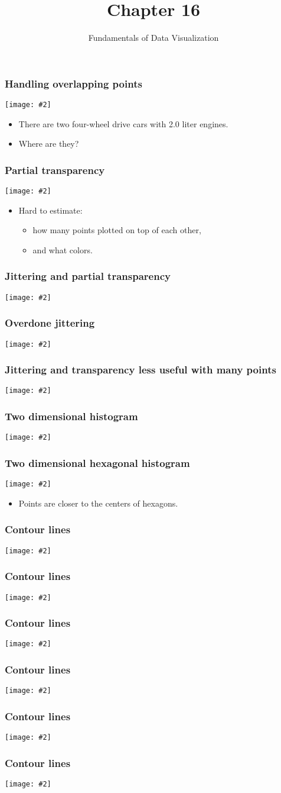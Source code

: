 \documentclass{beamer}
\author{Fundamentals of Data Visualization}
\title{Chapter 16}
\newcommand{\bi}{\begin{itemize}}
\newcommand{\li}{\item}
\newcommand{\ei}{\end{itemize}}
\newcommand{\fig}[2]{\centerline{\texttt{[image: \#2]}}}
\newcommand{\bfr}[1]{\begin{frame}[fragile]\frametitle{{ #1 }}}
\begin{document}
\begin{frame}
\maketitle
\end{frame}

\bfr{Handling overlapping points}
\fig{.8}{mpg-cty-displ-solid-1.png}
\bi
\li There are two four-wheel drive cars with 2.0 liter engines.
\li Where are they?
\ei
\end{frame}

\bfr{Partial transparency}
\fig{.8}{mpg-cty-displ-transp-1.png}
\bi
\li Hard to estimate:\bi
\li how many points plotted on top of each other,
\li and what colors.
\ei\ei
\end{frame}

\bfr{Jittering and partial transparency}
\fig{.8}{mpg-cty-displ-jitter-1.png}
\end{frame}


\bfr{Overdone jittering}
\fig{.8}{mpg-cty-displ-jitter-extreme-1.png}
\end{frame}

\bfr{Jittering and transparency less useful with many points}
\fig{.8}{nycflights-points-1.png}
\end{frame}

\bfr{Two dimensional histogram}
\fig{.8}{nycflights-2d-bins-1.png}
\end{frame}

\bfr{Two dimensional hexagonal histogram}
\fig{.8}{nycflights-hex-bins-1.png}
\bi
\li Points are closer to the centers of hexagons.
\ei
\end{frame}

\bfr{Contour lines}
\fig{1}{blue-jays-contour-1.png}
\end{frame}
\bfr{Contour lines}
\fig{1}{blue-jays-contour-filled-1.png}
\end{frame}
\bfr{Contour lines}
\fig{1}{blue-jays-contour-by-sex-1.png}
\end{frame}


\bfr{Contour lines}
\fig{1}{diamonds-points-1.png}
\end{frame}


\bfr{Contour lines}
\fig{1}{diamonds-contour-colors-1.png}
\end{frame}


\bfr{Contour lines}
\fig{1}{diamonds-contour-facets-1.png}
\end{frame}
\end{document}
